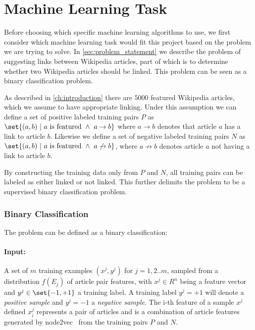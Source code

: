 

\section{Machine Learning Task}\label{sec:machine_learning_task}
Before choosing which specific machine learning algorithms to use, we first consider which machine learning task would fit this project based on the problem we are trying to solve. In \cref{sec:problem_statement} we describe the problem of suggesting links between Wikipedia articles, part of which is to determine whether two Wikipedia articles should be linked. This problem can be seen as a binary classification problem.

As described in \cref{ch:introduction} there are $5000$ featured Wikipedia articles, which we assume to have appropriate linking. Under this assumption we can define a set of positive labeled training pairs $P$ as $\set{(a,b)\ |\ a\text{ is featured}\ \wedge\ a \to b}$ where $a \to b$ denotes that article $a$ has a link to article $b$. Likewise we define a set of negative labeled training pairs $N$ as  $\set{(a,b)\ |\ a\text{ is featured}\ \wedge\ a \not\to b}$, where $a \not\to b$ denotes article $a$ not having a link to article $b$.

By constructing the training data only from $P$ and $N$, all training pairs can be labeled as either linked or not linked. This further delimits the problem to be a supervised binary classification problem.
 
\subsubsection{Binary Classification}

The problem can be defined as a binary classification:

\paragraph{Input:}
A set of $m$ training examples $(x^j,y^j)$ for $j=1,2..m$, sampled from a distribution $f(E_j)$ of article pair features, with $x^j \in R^n$ being a feature vector and $y^j \in \set{-1,+1}$ a training label. A training label $y^j=+1$ will denote a \textit{positive sample} and $y^j=-1$ a \textit{negative sample}. The i-th feature of a sample $x^j$ defined $x^j_i$ represents a pair of articles and is a combination of article features generated by node2vec~\cite{node2vec} from the training pairs $P$ and $N$.

